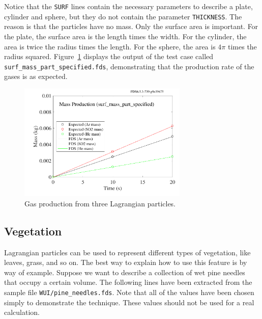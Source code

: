 \documentclass[11pt]{book}
\newcommand{\ct}{\tt\small}
\begin{document}
\noindent Notice that the {\ct SURF} lines contain the necessary parameters to describe a plate, cylinder and sphere, but they do not contain the parameter {\ct THICKNESS}. The reason is that the particles have no mass. Only the surface area is important. For the plate, the surface area is the length times the width. For the cylinder, the area is twice the radius times the length. For the sphere, the area is $4\pi$ times the radius squared. Figure~\ref{surf_mass_part_specified} displays the output of the test case called {\ct surf\_mass\_part\_specified.fds}, demonstrating that the production rate of the gases is as expected.

\begin{figure}[ht]
\begin{center}
\includegraphics[height=2.2in]{SCRIPT_FIGURES/surf_mass_part_specified}
\end{center}
\caption[Example of specified gas mass production from particles]{Gas production from three Lagrangian particles.}
\label{surf_mass_part_specified}
\end{figure}



\subsection{Vegetation}
\label{info:vegetation}

Lagrangian particles can be used to represent different types of vegetation, like leaves, grass, and so on. The best way to explain how to use this feature is by way of example. Suppose we want to describe a collection of wet pine needles that occupy a certain volume. The following lines have been extracted from the sample file {\ct WUI/pine\_needles.fds}. Note that all of the values have been chosen simply to demonstrate the technique. These values should not be used for a real calculation.
\end{document}
